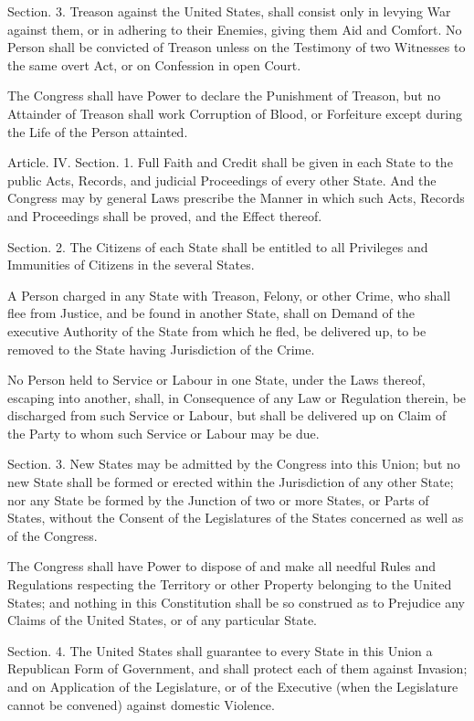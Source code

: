\documentclass{article}
\begin{document}
Section. 3.  Treason against the United States, shall consist only in
levying War against them, or in adhering to their Enemies, giving them
Aid and Comfort.  No Person shall be convicted of Treason unless on the
Testimony of two Witnesses to the same overt Act, or on Confession in
open Court.

The Congress shall have Power to declare the Punishment of Treason, but
no Attainder of Treason shall work Corruption of Blood, or Forfeiture
except during the Life of the Person attainted.

Article. IV.  Section. 1.  Full Faith and Credit shall be given in each
State to the public Acts, Records, and judicial Proceedings of every
other State. And the Congress may by general Laws prescribe the Manner
in which such Acts, Records and Proceedings shall be proved, and the
Effect thereof.

Section. 2.  The Citizens of each State shall be entitled to all
Privileges and Immunities of Citizens in the several States.

A Person charged in any State with Treason, Felony, or other Crime, who
shall flee from Justice, and be found in another State, shall on Demand
of the executive Authority of the State from which he fled, be delivered
up, to be removed to the State having Jurisdiction of the Crime.

No Person held to Service or Labour in one State, under the Laws
thereof, escaping into another, shall, in Consequence of any Law or
Regulation therein, be discharged from such Service or Labour, but shall
be delivered up on Claim of the Party to whom such Service or Labour may
be due.

Section. 3.  New States may be admitted by the Congress into this Union;
but no new State shall be formed or erected within the Jurisdiction of
any other State; nor any State be formed by the Junction of two or more
States, or Parts of States, without the Consent of the Legislatures of
the States concerned as well as of the Congress.

The Congress shall have Power to dispose of and make all needful Rules
and Regulations respecting the Territory or other Property belonging to
the United States; and nothing in this Constitution shall be so
construed as to Prejudice any Claims of the United States, or of any
particular State.

Section. 4.  The United States shall guarantee to every State in this
Union a Republican Form of Government, and shall protect each of them
against Invasion; and on Application of the Legislature, or of the
Executive (when the Legislature cannot be convened) against domestic
Violence.
\end{document}
